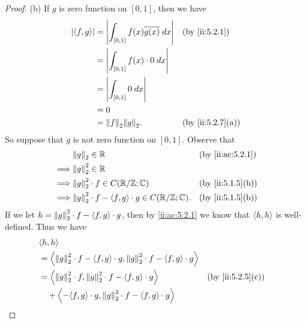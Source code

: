 \begin{proof}{(b)}
  If \(g\) is zero function on \([0, 1]\), then we have
  \begin{align*}
    \abs{\inner*{f, g}} & = \abs{\int_{[0, 1]} f(x) \overline{g(x)} \; dx} &  & \by{ii:5.2.1}    \\
                        & = \abs{\int_{[0, 1]} f(x) \cdot 0 \; dx}                               \\
                        & = \abs{\int_{[0, 1]} 0 \; dx}                                          \\
                        & = 0                                                                    \\
                        & = \norm*{f}_2 \norm*{g}_2.                       &  & \by{ii:5.2.7}[a]
  \end{align*}
  So suppose that \(g\) is not zero function on \([0, 1]\).
  Observe that
  \begin{align*}
             & \norm*{g}_2 \in \R                                                 &  & \by{ii:ac:5.2.1} \\
    \implies & \norm*{g}_2^2 \in \R                                                                     \\
    \implies & \norm*{g}_2^2 \cdot f \in C(\R / \Z ; \C)                          &  & \by{ii:5.1.5}[b] \\
    \implies & \norm*{g}_2^2 \cdot f - \inner*{f, g} \cdot g \in C(\R / \Z ; \C). &  & \by{ii:5.1.5}[b]
  \end{align*}
  If we let \(h = \norm*{g}_2^2 \cdot f - \inner*{f, g} \cdot g\), then by \cref{ii:ac:5.2.1} we know that \(\inner*{h, h}\) is well-defined.
  Thus we have
  \begin{align*}
     & \inner*{h, h}                                                                                                                                  \\
     & = \inner*{\norm*{g}_2^2 \cdot f - \inner*{f, g} \cdot g, \norm*{g}_2^2 \cdot f - \inner*{f, g} \cdot g}                                        \\
     & = \inner*{\norm*{g}_2^2 \cdot f, \norm*{g}_2^2 \cdot f - \inner*{f, g} \cdot g}                                          &  & \by{ii:5.2.5}[c] \\
     & \quad + \inner*{-\inner*{f, g} \cdot g, \norm*{g}_2^2 \cdot f - \inner*{f, g} \cdot g}                                                         \\

\end{align*}
\end{proof}
